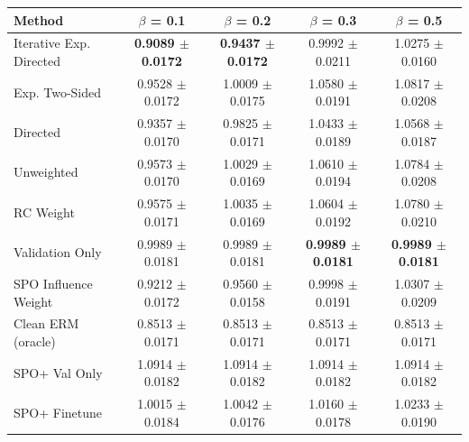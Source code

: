 \begin{tabular}{lcccc}
\toprule
Method & $\beta$ = 0.1 & $\beta$ = 0.2 & $\beta$ = 0.3 & $\beta$ = 0.5 \\
\midrule
Iterative Exp. Directed & \textbf{0.9089 $\pm$ 0.0172} & \textbf{0.9437 $\pm$ 0.0172} & 0.9992 $\pm$ 0.0211 & 1.0275 $\pm$ 0.0160 \\
Exp. Two-Sided & 0.9528 $\pm$ 0.0172 & 1.0009 $\pm$ 0.0175 & 1.0580 $\pm$ 0.0191 & 1.0817 $\pm$ 0.0208 \\
Directed & 0.9357 $\pm$ 0.0170 & 0.9825 $\pm$ 0.0171 & 1.0433 $\pm$ 0.0189 & 1.0568 $\pm$ 0.0187 \\
Unweighted & 0.9573 $\pm$ 0.0170 & 1.0029 $\pm$ 0.0169 & 1.0610 $\pm$ 0.0194 & 1.0784 $\pm$ 0.0208 \\
RC Weight & 0.9575 $\pm$ 0.0171 & 1.0035 $\pm$ 0.0169 & 1.0604 $\pm$ 0.0192 & 1.0780 $\pm$ 0.0210 \\
Validation Only & 0.9989 $\pm$ 0.0181 & 0.9989 $\pm$ 0.0181 & \textbf{0.9989 $\pm$ 0.0181} & \textbf{0.9989 $\pm$ 0.0181} \\
SPO Influence Weight & 0.9212 $\pm$ 0.0172 & 0.9560 $\pm$ 0.0158 & 0.9998 $\pm$ 0.0191 & 1.0307 $\pm$ 0.0209 \\
Clean ERM (oracle) & 0.8513 $\pm$ 0.0171 & 0.8513 $\pm$ 0.0171 & 0.8513 $\pm$ 0.0171 & 0.8513 $\pm$ 0.0171 \\
SPO+ Val Only & 1.0914 $\pm$ 0.0182 & 1.0914 $\pm$ 0.0182 & 1.0914 $\pm$ 0.0182 & 1.0914 $\pm$ 0.0182 \\
SPO+ Finetune & 1.0015 $\pm$ 0.0184 & 1.0042 $\pm$ 0.0176 & 1.0160 $\pm$ 0.0178 & 1.0233 $\pm$ 0.0190 \\
\bottomrule
\end{tabular}

